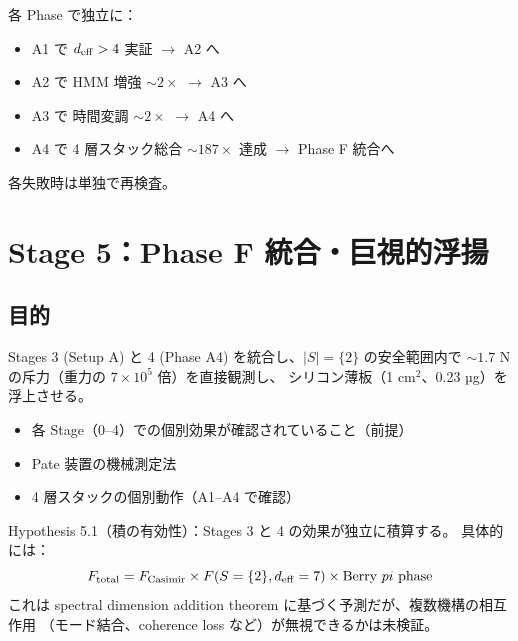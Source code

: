 \documentclass[11pt,a4paper]{article}
\def\pi{pi}%
\def\textbf#1{#1}%
\begin{document}
各 Phase で独立に：
\begin{itemize}
\item A1 で $d_{\rm eff} > 4$ 実証 $\to$ A2 へ
\item A2 で HMM 増強 $\sim 2\times$ $\to$ A3 へ
\item A3 で 時間変調 $\sim 2\times$ $\to$ A4 へ
\item A4 で 4 層スタック総合 $\sim 187\times$ 達成 $\to$ Phase F 統合へ
\end{itemize}

各失敗時は単独で再検査。

\newpage

\section{Stage 5：Phase F 統合・巨視的浮揚}

\subsection{目的}

Stages 3 (Setup A) と 4 (Phase A4) を統合し、$|S|=\{2\}$ の安全範囲内で
\textbf{$\sim 1.7$ N の斥力（重力の $7 \times 10^5$ 倍）を直接観測}し、
シリコン薄板（1 cm$^2$、0.23 µg）を浮上させる。

\begin{confirmedbox}
\begin{itemize}
\item 各 Stage（0--4）での個別効果が確認されていること（前提）
\item Pate 装置の機械測定法
\item 4 層スタックの個別動作（A1--A4 で確認）
\end{itemize}
\end{confirmedbox}

\begin{hypothesisbox}
\textbf{Hypothesis 5.1（積の有効性）}：Stages 3 と 4 の効果が独立に積算する。
具体的には：
\[
  F_{\rm total} = F_{\rm Casimir} \times F(S=\{2\}, d_{\rm eff}=7) \times \text{Berry } \pi \text{ phase}
\]
これは spectral dimension addition theorem に基づく予測だが、複数機構の相互作用
（モード結合、coherence loss など）が無視できるかは未検証。
\end{hypothesisbox}
\end{document}
